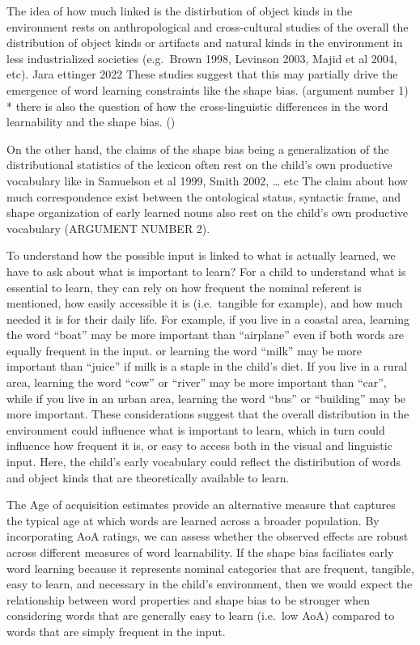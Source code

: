 \documentclass[
  english,
  man]{apa6}
\begin{document}
The idea of how much linked is the distirbution of object kinds in the environment rests on anthropological and cross-cultural studies of the overall the distribution of object kinds or artifacts and natural kinds in the environment in less industrialized societies (e.g.~Brown 1998, Levinson 2003, Majid et al 2004, etc). Jara ettinger 2022 These studies suggest that this may partially drive the emergence of word learning constraints like the shape bias. (argument number 1) * there is also the question of how the cross-linguistic differences in the word learnability and the shape bias. ()

On the other hand, the claims of the shape bias being a generalization of the distributional statistics of the lexicon often rest on the child's own productive vocabulary like in Samuelson et al 1999, Smith 2002, \ldots{} etc
The claim about how much correspondence exist between the ontological status, syntactic frame, and shape organization of early learned nouns also rest on the child's own productive vocabulary (ARGUMENT NUMBER 2).

To understand how the possible input is linked to what is actually learned, we have to ask about what is important to learn? For a child to understand what is essential to learn, they can rely on how frequent the nominal referent is mentioned, how easily accessible it is (i.e.~tangible for example), and how much needed it is for their daily life. For example, if you live in a coastal area, learning the word ``boat'' may be more important than ``airplane'' even if both words are equally frequent in the input. or learning the word ``milk'' may be more important than ``juice'' if milk is a staple in the child's diet. If you live in a rural area, learning the word ``cow'' or ``river'' may be more important than ``car'', while if you live in an urban area, learning the word ``bus'' or ``building'' may be more important. These considerations suggest that the overall distribution in the environment could influence what is important to learn, which in turn could influence how frequent it is, or easy to access both in the visual and linguistic input. Here, the child's early vocabulary could reflect the distiribution of words and object kinds that are theoretically available to learn.

The Age of acquisition estimates provide an alternative measure that captures the typical age at which words are learned across a broader population. By incorporating AoA ratings, we can assess whether the observed effects are robust across different measures of word learnability. If the shape bias faciliates early word learning because it represents nominal categories that are frequent, tangible, easy to learn, and necessary in the child's environment, then we would expect the relationship between word properties and shape bias to be stronger when considering words that are generally easy to learn (i.e.~low AoA) compared to words that are simply frequent in the input.
\end{document}
